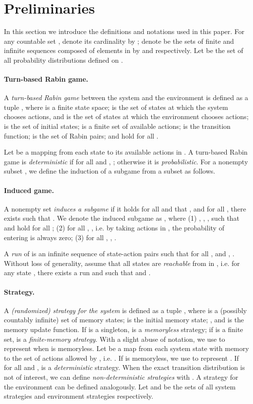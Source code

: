 \documentclass[runningheads,a4paper]{llncs}
\begin{document}
\section{Preliminaries}
In this section we introduce the definitions and notations used in this paper. For any countable set , denote its cardinality by ; denote be the sets of finite and infinite sequences composed of elements in  by  and  respectively. Let  be the set of all probability distributions defined on . 

\paragraph{Turn-based Rabin game.}
A \emph{turn-based Rabin game} between the system and the environment is defined as a tuple , where  is a finite state space;  is the set of states at which the system chooses actions, and  is the set of states at which the environment chooses actions;  is the set of initial states;  is a finite set of available actions;  is the transition function;  is the set of Rabin pairs;  and  hold for all .

Let  be a mapping from each state to its available actions in . A turn-based Rabin game is \emph{deterministic} if for all  and , ; otherwise it is \emph{probabilistic}. For a nonempty subset , we define the induction of a subgame from a subset as follows. 


\paragraph{Induced game.}
A nonempty set  \emph{induces a subgame } if it holds for all  and  that , and for all , there exists  such that . We denote the induced subgame as , where (1) , , ,  such that  and  hold for all ; (2) for all , , i.e. by taking actions in , the probability of entering  is always zero; (3) for all , , . 

A \emph{run}  of  is an infinite sequence of state-action pairs such that for all ,  and ,  . Without loss of generality, assume that all states are \emph{reachable} from  in , i.e. for any state , there exists a run  and  such that  and . 

\paragraph{Strategy.}
A \emph{(randomized) strategy for the system} is defined as a tuple , where  is a (possibly countably infinite) set of memory states;  is the initial memory state; , and  is the memory update function. If  is a singleton,  is a \emph{memoryless} strategy; if  is a finite set,  is a \emph{finite-memory strategy}. With a slight abuse of notation, we use  to represent  when  is memoryless. 
Let  be a map from each system state  with memory  to the set of actions allowed by , i.e. . If  is memoryless, we use  to represent .
If  for all  and ,  is a \emph{deterministic} strategy. When the exact transition distribution is not of interest, we can define \emph{non-deterministic strategies} with .
A strategy  for the environment can be defined analogously. Let  and  be the sets of all system strategies and environment strategies respectively. 
\end{document}
